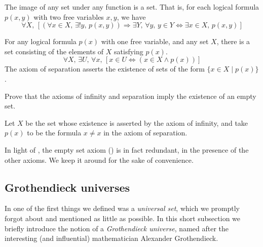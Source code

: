 \begin{axiom}
\label{axZFCReplacement}
The image of any set under any function is a set. That is, for each logical formula $p(x,y)$ with two free variables $x,y$, we have
\[ \forall X,\, [(\forall x \in X,\, \exists ! y,\, p(x,y)) \Rightarrow \exists Y,\, \forall y,\, y \in Y \Leftrightarrow \exists x \in X,\, p(x,y)] \]
\end{axiom}

\begin{axiom}
\label{axZFCSeparation}
For any logical formula $p(x)$ with one free variable, and any set $X$, there is a set consisting of the elements of $X$ satisfying $p(x)$.
\[ \forall X,\, \exists U,\, \forall x,\, [x \in U \Leftrightarrow (x \in X \wedge p(x))] \]
The axiom of separation asserts the existence of sets of the form $\{ x \in X \mid p(x) \}$.
\end{axiom}

\begin{exercise}
\label{exEmptySetFromInfinityAndSeparation}
Prove that the axioms of infinity and separation imply the existence of an empty set.
\begin{backhint}
Let $X$ be the set whose existence is asserted by the axiom of infinity, and take $p(x)$ to be the formula $x \ne x$ in the axiom of separation.
\end{backhint}
\end{exercise}

In light of , the empty set axiom () is in fact redundant, in the presence of the other axioms. We keep it around for the sake of convenience.



\subsection*{Grothendieck universes}
\label{subsecGrothendieckUniverses}

In  one of the first things we defined was a \textit{universal set}, which we promptly forgot about and mentioned as little as possible. In this short subsection we briefly introduce the notion of a \textit{Grothendieck universe}, named after the interesting (and influential) mathematician Alexander Grothendieck.

